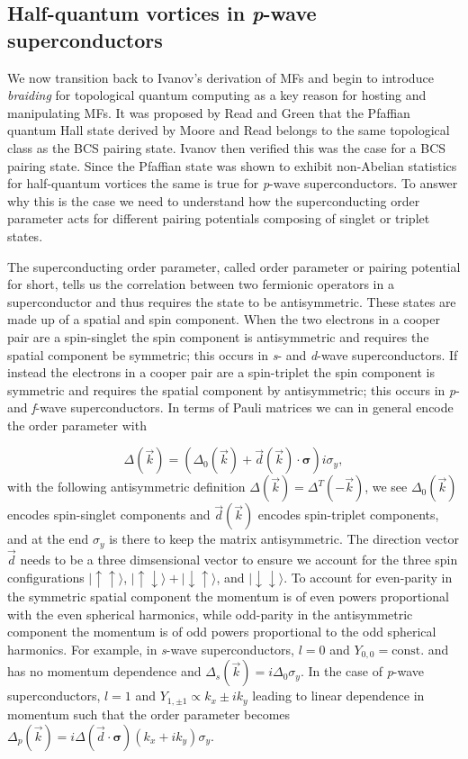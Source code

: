 \subsection{Half-quantum vortices in \textit{p}-wave superconductors}
We now transition back to Ivanov's derivation of MFs and begin to introduce \textit{braiding} for topological quantum computing as a key reason for hosting and manipulating MFs.
It was proposed by Read and Green that the Pfaffian quantum Hall state derived by Moore and Read belongs to the same topological class as the BCS pairing state.
Ivanov then verified this was the case for a BCS pairing state.
Since the Pfaffian state was shown to exhibit non-Abelian statistics for half-quantum vortices the same is true for \textit{p}-wave superconductors.
To answer why this is the case we need to understand how the superconducting order parameter acts for different pairing potentials composing of singlet or triplet states.

The superconducting order parameter, called order parameter or pairing potential for short, tells us the correlation between two fermionic operators in a superconductor and thus requires the state to be antisymmetric.
These states are made up of a spatial and spin component.
When the two electrons in a cooper pair are a spin-singlet the spin component is antisymmetric and requires the spatial component be symmetric; this occurs in \textit{s}- and \textit{d}-wave superconductors.
If instead the electrons in a cooper pair are a spin-triplet the spin component is symmetric and requires the spatial component by antisymmetric; this occurs in \textit{p}- and \textit{f}-wave superconductors.
In terms of Pauli matrices we can in general encode the order parameter with

\begin{equation}
  \Delta (\vec{k}) = \left(\Delta_0 (\vec{k}) + \vec{d}(\vec{k}) \cdot \bm{\sigma}\right) i \sigma_y,
\end{equation}
with the following antisymmetric definition $\Delta(\vec{k}) = \Delta^T(-\vec{k})$, we see $\Delta_0 (\vec{k})$ encodes spin-singlet components and $\vec{d}(\vec{k})$ encodes spin-triplet components, and at the end $\sigma_y$ is there to keep the matrix antisymmetric.
The direction vector $\vec{d}$ needs to be a three dimsensional vector to ensure we account for the three spin configurations
$|\uparrow\uparrow\rangle$, $|\uparrow\downarrow\rangle + |\downarrow\uparrow\rangle$, and $|\downarrow\downarrow\rangle$.
To account for even-parity in the symmetric spatial component the momentum is of even powers proportional with the even spherical harmonics, while odd-parity in the antisymmetric component the momentum is of odd powers proportional to the odd spherical harmonics.
For example, in \textit{s}-wave superconductors, $l=0$ and $Y_{0,0} = \text{const.}$ and has no momentum dependence and
$\Delta_s (\vec{k}) = i\Delta_0 \sigma_y$.
In the case of \textit{p}-wave superconductors, $l=1$ and $Y_{1,\pm1} \propto k_x \pm i k_y$ leading to linear dependence in momentum such that the order parameter becomes
$\Delta_p(\vec{k}) = i\Delta (\vec{d} \cdot \bm{\sigma}) (k_x+ik_y) \sigma_y$.


